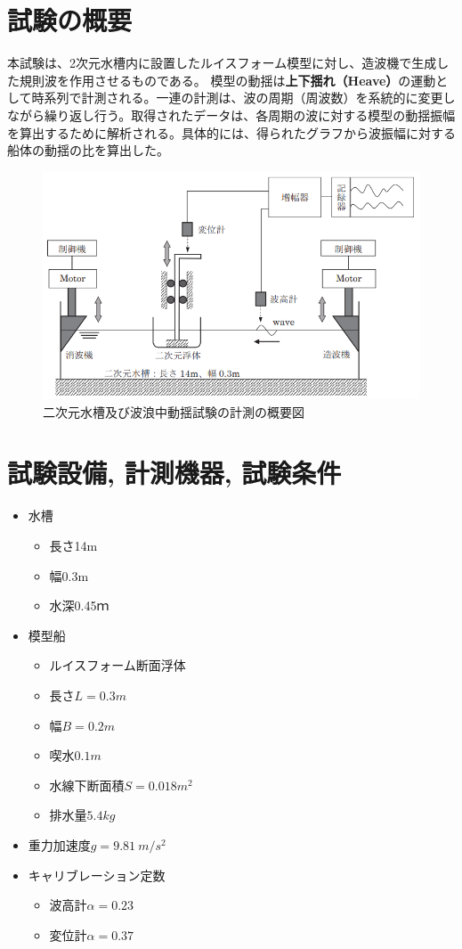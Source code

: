 \documentclass[dvipdfmx,a4paper]{jreport} %
\begin{document}
\section{試験の概要}
本試験は、2次元水槽内に設置したルイスフォーム模型に対し、造波機で生成した規則波を作用させるものである。
模型の動揺は\textbf{上下揺れ（Heave）}の運動として時系列で計測される。一連の計測は、波の周期（周波数）を系統的に変更しながら繰り返し行う。取得されたデータは、各周期の波に対する模型の動揺振幅を算出するために解析される。具体的には、得られたグラフから波振幅に対する船体の動揺の比を算出した。
\begin{figure}[H]
    \centering
    \includegraphics[width=0.8\linewidth]{summer/ship-experiment/2d-pool/pictures/gaiyo.png}
    \caption{二次元水槽及び波浪中動揺試験の計測の概要図}
    \label{fig:gaiyo}
\end{figure}

\section{試験設備, 計測機器, 試験条件}

\begin{itemize}
    \item 水槽
    \begin{itemize}
        \item 長さ14m
        \item 幅0.3m
        \item 水深0.45ｍ
    \end{itemize}
    \item 模型船
    \begin{itemize}
        \item ルイスフォーム断面浮体
        \item 長さ$L=0.3m$
        \item 幅$B=0.2m$
        \item 喫水$0.1m$
        \item 水線下断面積$S=0.018m^2$
        \item 排水量$5.4kg$
    \end{itemize}
    \item 重力加速度$g=9.81\ m/s^2$
    \item キャリブレーション定数
        \begin{itemize}
            \item 波高計$\alpha=0.23$
            \item 変位計$\alpha=0.37$
        \end{itemize}
\end{itemize}
\end{document}
